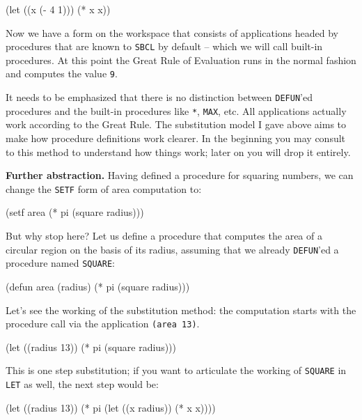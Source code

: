 \documentclass[a4paper,11pt]{article}
\begin{document}
\begin{uenum}
\begin{lispcode}
(let ((x (- 4 1))) (* x x))
\end{lispcode}

Now we have a form on the workspace that consists of applications headed by procedures that are known to \Verb+SBCL+ by default -- which we will call built-in procedures. At this point the Great Rule of Evaluation runs in the normal fashion and computes the value \Verb+9+.

\begin{uenumi}
\item It needs to be emphasized that there is no distinction between \Verb+DEFUN+'ed procedures and the built-in procedures like \Verb+*+, \Verb+MAX+, etc. All applications actually work according to the Great Rule. The substitution model I gave above aims to make how procedure definitions work clearer. In the beginning you may consult to this method to understand how things work; later on you will drop it entirely.
\end{uenumi}

\item {\bf Further abstraction.} Having defined a procedure for squaring numbers, we can change the \Verb+SETF+ form of area computation to: 

\begin{lispcode}
(setf area (* pi (square radius)))
\end{lispcode}

But why stop here? Let us define a procedure that computes the area of a circular region on the basis of its radius, assuming that we already \Verb+DEFUN+'ed a procedure named \Verb+SQUARE+:

\begin{lispcode}
(defun area (radius) (* pi (square radius)))
\end{lispcode}

Let's see the working of the substitution method: the computation starts with the procedure call via the application \Verb+(area 13)+.

\begin{lispcode}
(let ((radius 13))
  (* pi (square radius)))
\end{lispcode}

This is one step substitution; if you want to articulate the working of \Verb+SQUARE+ in \Verb+LET+ as well, the next step would be:

\begin{lispcode}
(let ((radius 13))
  (* pi (let ((x radius))
          (* x x))))
\end{lispcode}


\end{uenum}
\end{document}

